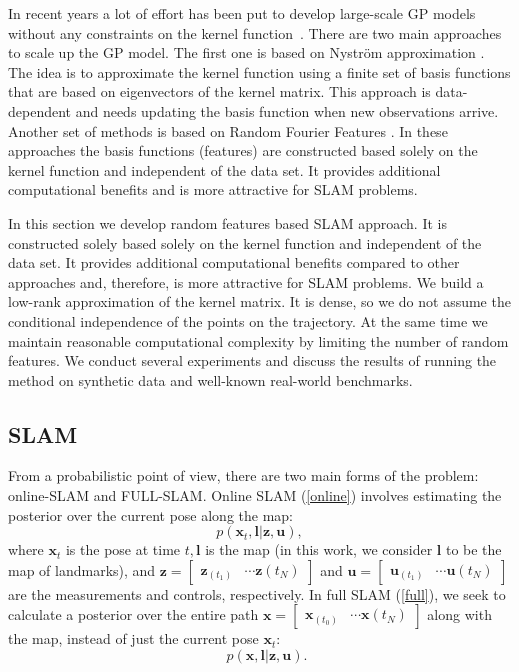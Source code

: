 In recent years a lot of effort has been put to develop large-scale GP models without any constraints on the kernel function~\cite{rudi2017falkon, wang2019exact, munkhoeva2018quadrature}.
There are two main approaches to scale up the GP model.
The first one is based on Nystr{\"o}m approximation \cite{quinonero2005unifying}.
The idea is to approximate the kernel function using a finite set of basis functions that are based on eigenvectors of the kernel matrix.
This approach is data-dependent and needs updating the basis function when new observations arrive.
Another set of methods is based on Random Fourier Features \cite{rahimi2008random}.
In these approaches the basis functions (features) are constructed based solely on the kernel function and independent of the data set.
It provides additional computational benefits and is more attractive for SLAM problems.

In this section we develop random features based SLAM
approach.
It is constructed solely based solely on the kernel function
and independent of the data set.
It provides additional computational benefits compared to other approaches
and, therefore, is more attractive for SLAM problems.
We build a low-rank approximation of the kernel matrix.
It is dense, so we do not assume the conditional independence of the points on the trajectory.
At the same time we maintain reasonable computational complexity by limiting the number of random features.
We conduct several experiments and discuss the results of running the method on synthetic data and well-known real-world benchmarks.


\subsection{SLAM}
From a probabilistic point of view, there are two main forms of the problem: online-SLAM and FULL-SLAM. Online SLAM (\ref{online}) involves estimating the posterior over the current pose along the map:
\begin{equation} \label{online}
p\left(\bm{x}_{t}, \bm{l} | \mathbf{z}, \mathbf{u}\right),
\end{equation}
where $\bm{x}_{t}$ is the pose at time $t, \bm{l}$ is the map (in this work, we consider $\bm{l}$ to be the map of landmarks), and $\mathbf{z} = \begin{bmatrix}\bm{z}_(t_1) & \cdots \bm{z}(t_N)\end{bmatrix}$ and $\mathbf{u} = \begin{bmatrix}\bm{u}_(t_1) & \cdots \bm{u}(t_N)\end{bmatrix}$ are the measurements and controls, respectively.
In full SLAM (\ref{full}), we seek to calculate a posterior over the entire path $\mathbf{x} = \begin{bmatrix}\bm{x}_(t_0) & \cdots \bm{x}(t_N)\end{bmatrix}$ along with the map, instead of just the current pose $\bm{x}_{t}$:
\begin{equation}\label{full}
    \quad p\left(\mathbf{x}, \bm{l} | \mathbf{z}, \mathbf{u}\right).
\end{equation}

